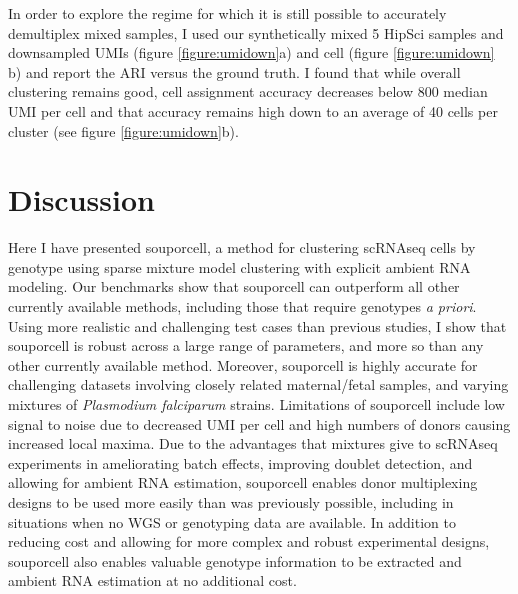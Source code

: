 \par{
In order to explore the regime for which it is still possible to accurately demultiplex mixed samples, I
used our synthetically mixed 5 HipSci samples and downsampled UMIs (figure \ref{figure:umidown}a) and cell (figure \ref{figure:umidown}
b) and report the ARI versus the ground truth. I found that while overall clustering remains good, cell
assignment accuracy decreases below 800 median UMI per cell and that accuracy remains high down to
an average of 40 cells per cluster (see figure \ref{figure:umidown}b). 
}






\section{Discussion}
\par{
Here I have presented souporcell, a method for clustering scRNAseq cells by genotype using sparse mixture model clustering with explicit ambient RNA modeling. Our benchmarks show that souporcell can outperform all other currently available methods, including those that require genotypes \textit{a priori}. Using more realistic and challenging test cases than previous studies, I show that souporcell is robust across a large range of parameters, and more so than any other currently available method. Moreover, souporcell is highly accurate for challenging datasets involving closely related maternal/fetal samples, and varying mixtures of \textit{Plasmodium falciparum} strains. Limitations of souporcell include low signal to noise due to decreased UMI per cell and high numbers of donors causing increased local maxima. Due to the advantages that mixtures give to scRNAseq experiments in ameliorating batch effects, improving doublet detection, and allowing for ambient RNA estimation, souporcell enables donor multiplexing designs to be used more easily than was previously possible, including in situations when no WGS or genotyping data are available. In addition to reducing cost and allowing for more complex and robust experimental designs, souporcell also enables valuable genotype information to be extracted and ambient RNA estimation at no additional cost.
}

